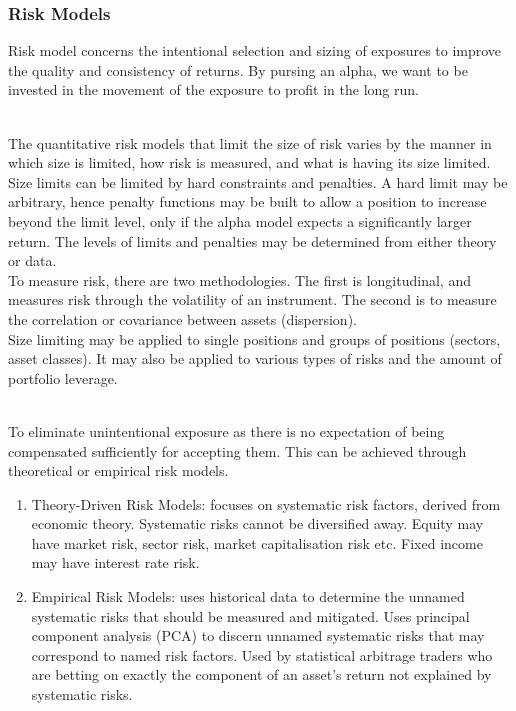 \subsubsection{Risk Models}

Risk model concerns the intentional selection and sizing of exposures to improve the quality and consistency of returns. By pursing an alpha, we want to be invested in the movement of the exposure to profit in the long run.

\begin{method} \\
The quantitative risk models that limit the size of risk varies by the manner in which size is limited, how risk is measured, and what is having its size limited.\\
Size limits can be limited by hard constraints and penalties. A hard limit may be arbitrary, hence penalty functions may be built to allow a position to increase beyond the limit level, only if the alpha model expects a significantly larger return. The levels of limits and penalties may be determined from either theory or data.\\
To measure risk, there are two methodologies. The first is longitudinal, and measures risk through the volatility of an instrument. The second is to measure the correlation or covariance between assets (dispersion).\\
Size limiting may be applied to single positions and groups of positions (sectors, asset classes). It may also be applied to various types of risks and the amount of portfolio leverage.
\end{method}

\begin{method} \\
To eliminate unintentional exposure as there is no expectation of being compensated sufficiently for accepting them. This can be achieved through theoretical or empirical risk models.
\begin{enumerate}[label=\roman*.]
\setlength{\itemsep}{0pt}
\item Theory-Driven Risk Models: focuses on systematic risk factors, derived from economic theory. Systematic risks cannot be diversified away. Equity may have market risk, sector risk, market capitalisation risk etc. Fixed income may have interest rate risk.
\item Empirical Risk Models: uses historical data to determine the unnamed systematic risks that should be measured and mitigated. Uses principal component analysis (PCA) to discern unnamed systematic risks that may correspond to named risk factors. Used by statistical arbitrage traders who are betting on exactly the component of an asset's return not explained by systematic risks.
\end{enumerate}
\end{method}
